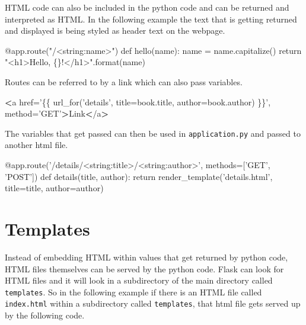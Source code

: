 \documentclass[]{book}
\newenvironment{Shaded}{\begin{snugshade}}{\end{snugshade}}
\newcommand{\StringTok}[1]{\textcolor[rgb]{0.31,0.60,0.02}{#1}}
\newcommand{\OperatorTok}[1]{\textcolor[rgb]{0.81,0.36,0.00}{\textbf{#1}}}
\newcommand{\BuiltInTok}[1]{#1}
\newcommand{\ExtensionTok}[1]{#1}
\newcommand{\NormalTok}[1]{#1}
\begin{document}
HTML code can also be included in the python code and can be returned
and interpreted as HTML. In the following example the text that is
getting returned and displayed is being styled as header text on the
webpage.

\begin{Shaded}
\begin{Highlighting}[]
\ExtensionTok{@app.route}\NormalTok{(}\StringTok{"/<string:name>"}\NormalTok{)}
\ExtensionTok{def}\NormalTok{ hello(name)}\BuiltInTok{:}
    \ExtensionTok{name}\NormalTok{ = name.capitalize()}
    \BuiltInTok{return} \StringTok{"<h1>Hello, \{\}!</h1>"}\NormalTok{.format(name)}
\end{Highlighting}
\end{Shaded}

Routes can be referred to by a link which can also pass variables.

\begin{Shaded}
\begin{Highlighting}[]
\OperatorTok{<}\ExtensionTok{a}\NormalTok{ href=}\StringTok{'\{\{ url_for('}\NormalTok{details}\StringTok{', title=book.title, author=book.author) \}\}'}\NormalTok{, method=}\StringTok{'GET'}\OperatorTok{>}\NormalTok{Link}\OperatorTok{<}\NormalTok{/a}\OperatorTok{>}
\end{Highlighting}
\end{Shaded}

The variables that get passed can then be used in
\texttt{application.py} and passed to another html file.

\begin{Shaded}
\begin{Highlighting}[]
\ExtensionTok{@app.route}\NormalTok{(}\StringTok{'/details/<string:title>/<string:author>'}\NormalTok{, methods=[}\StringTok{'GET'}\NormalTok{, }\StringTok{'POST'}\NormalTok{])}
\ExtensionTok{def}\NormalTok{ details(title, author)}\BuiltInTok{:}                                                   
    \BuiltInTok{return}\NormalTok{ render_template(}\StringTok{'details.html'}\NormalTok{, title=title, author=author)        }
\end{Highlighting}
\end{Shaded}

\section{Templates}\label{templates}

Instead of embedding HTML within values that get returned by python
code, HTML files themselves can be served by the python code. Flask can
look for HTML files and it will look in a subdirectory of the main
directory called \texttt{templates}. So in the following example if
there is an HTML file called \texttt{index.html} within a subdirectory
called \texttt{templates}, that html file gets served up by the
following code.
\end{document}
